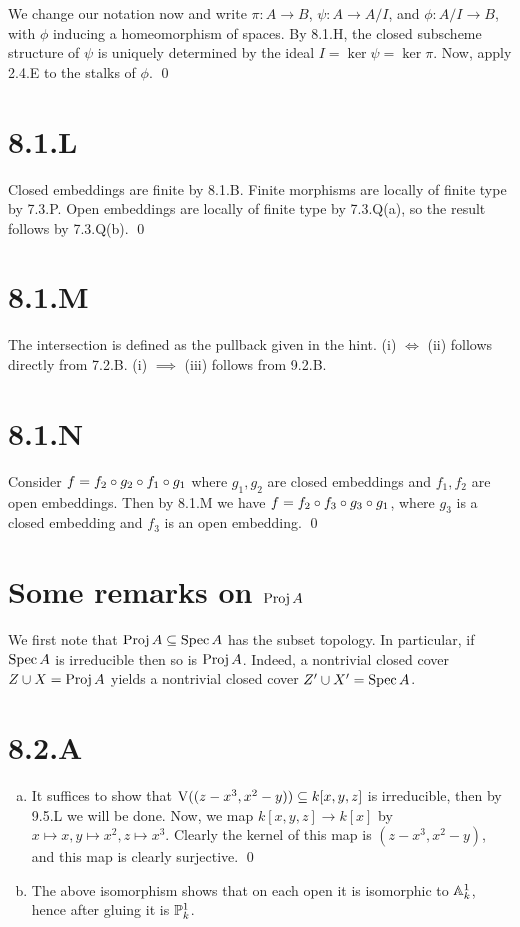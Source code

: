 \documentclass{article}
\begin{document}
We change our notation now and write $\pi: A \to B$,
$\psi: A \to A/I$, and $\phi: A/I \to B$, with
$\phi$ inducing a homeomorphism of spaces. By 8.1.H, the
closed subscheme structure of $\psi$ is uniquely determined by
the ideal $I=\ker \psi = \ker \pi$. Now, apply 2.4.E to the stalks of
$\phi$. \qed

\section{8.1.L}
Closed embeddings are finite by 8.1.B. Finite morphisms are locally of finite
type by 7.3.P. Open embeddings are locally of finite type by 7.3.Q(a), so the
result follows by 7.3.Q(b). \qed

\section{8.1.M}
The intersection is defined as the pullback given in the hint. (i)
$\iff$ (ii) follows directly from 7.2.B. (i)
$\implies$ (iii) follows from 9.2.B.

\section{8.1.N}
Consider $f=f_2 \after g_2 \after f_1 \after g_1$ where $g_1, g_2$ are closed
embeddings and $f_1, f_2$ are open embeddings. Then by 8.1.M we
have $f=f_2 \after f_3 \after g_3 \after g_1$, where $g_3$ is a closed
embedding and $f_3$ is an open embedding. \qed

\section{Some remarks on $\Proj A$}
We first note that $\Proj A \subseteq \Spec A$ has the subset topology. In
particular, if $\Spec A$ is irreducible then so is
$\Proj A$. Indeed, a nontrivial closed cover
$Z \union X = \Proj A$ yields a nontrivial closed cover
$Z' \union X' = \Spec A$.

\section{8.2.A}
\begin{enumerate}[a.]
    \item It suffices to show that $\V((z-x^3, x^2-y)) \subseteq k[x, y ,z]$ is irreducible, then by 9.5.L
          we will be done. Now, we map $k[x, y ,z] \to k[x]$ by $x \mapsto x, y \mapsto x^2, z \mapsto x^3$.
          Clearly the kernel of this map is $(z-x^3, x^2-y)$, and this map is
          clearly surjective. \qed
    \item The above isomorphism shows that on each open it is isomorphic to
          $\A^1_k$, hence after gluing it is $\P^1_k$.
\end{enumerate}
\end{document}
